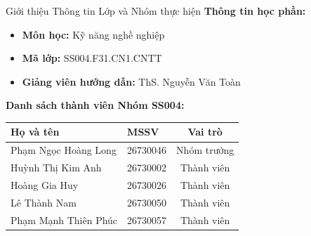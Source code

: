 \documentclass[aspectratio=169]{beamer}
\begin{document}
\begin{frame}{Giới thiệu Thông tin Lớp và Nhóm thực hiện}
    \textbf{Thông tin học phần:}
    \begin{itemize}
        \item \textbf{Môn học:} Kỹ năng nghề nghiệp
        \item \textbf{Mã lớp:} SS004.F31.CN1.CNTT
        \item \textbf{Giảng viên hướng dẫn:} ThS. Nguyễn Văn Toàn %
    \end{itemize}
    \vspace{0.3cm}
    
    \textbf{Danh sách thành viên Nhóm SS004:}
    \begin{table}[]
        \centering
        \begin{tabular}{@{}llc@{}}
        \toprule
        \textbf{Họ và tên} & \textbf{MSSV} & \textbf{Vai trò} \\ \midrule
        Phạm Ngọc Hoàng Long & 26730046 & Nhóm trưởng \\
        Huỳnh Thị Kim Anh & 26730002 & Thành viên \\
        Hoàng Gia Huy & 26730026 & Thành viên \\ 
        Lê Thành Nam & 26730050 & Thành viên \\
        Phạm Mạnh Thiên Phúc & 26730057 & Thành viên \\ \bottomrule
        \end{tabular}
    \end{table}
\end{frame}
\end{document}
